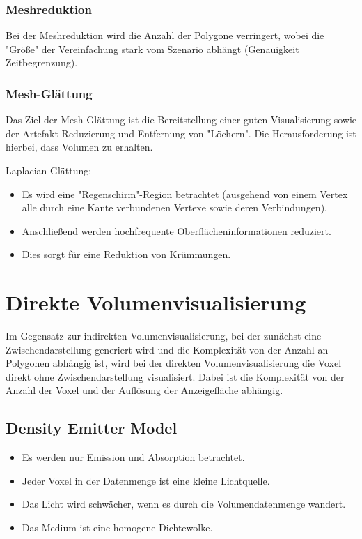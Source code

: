 			\subsubsection{Meshreduktion}
				Bei der Meshreduktion wird die Anzahl der Polygone verringert, wobei die "Größe" der Vereinfachung stark vom Szenario abhängt (Genauigkeit \vs Zeitbegrenzung).

			\subsubsection{Mesh-Glättung}
				Das Ziel der Mesh-Glättung ist die Bereitstellung einer guten Visualisierung sowie der Artefakt-Reduzierung und Entfernung von "Löchern". Die Herausforderung ist hierbei, dass Volumen zu erhalten.
				
				Laplacian Glättung:
				\begin{itemize}
					\item Es wird eine "Regenschirm"-Region betrachtet (\dh ausgehend von einem Vertex alle durch eine Kante verbundenen Vertexe sowie deren Verbindungen).
					\item Anschließend werden hochfrequente Oberflächeninformationen reduziert.
					\item Dies sorgt für eine Reduktion von Krümmungen.
				\end{itemize}

	\section{Direkte Volumenvisualisierung}
		Im Gegensatz zur indirekten Volumenvisualisierung, bei der zunächst eine Zwischendarstellung generiert wird und die Komplexität von der Anzahl an Polygonen abhängig ist, wird bei der direkten Volumenvisualisierung die Voxel direkt ohne Zwischendarstellung visualisiert. Dabei ist die Komplexität von der Anzahl der Voxel und der Auflösung der Anzeigefläche abhängig.

		\subsection{Density Emitter Model}
			\begin{itemize}
				\item Es werden nur Emission und Absorption betrachtet.
				\item Jeder Voxel in der Datenmenge ist eine kleine Lichtquelle.
				\item Das Licht wird schwächer, wenn es durch die Volumendatenmenge wandert.
				\item Das Medium ist eine homogene Dichtewolke.
			\end{itemize}
		
